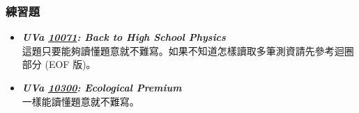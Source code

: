 \subsubsection*{練習題}
\begin{itemize}[label={\Checkmark}]
\item \textbf{\textit{UVa \href{http://uva.onlinejudge.org/external/100/10071.html}{10071}: Back to High School Physics}}\\
這題只要能夠讀懂題意就不難寫。如果不知道怎樣讀取多筆測資請先參考迴圈部分 (EOF 版)。
\item \textbf{\textit{UVa \href{http://uva.onlinejudge.org/external/103/10300.html}{10300}: Ecological Premium}}\\
一樣能讀懂題意就不難寫。
\end{itemize}